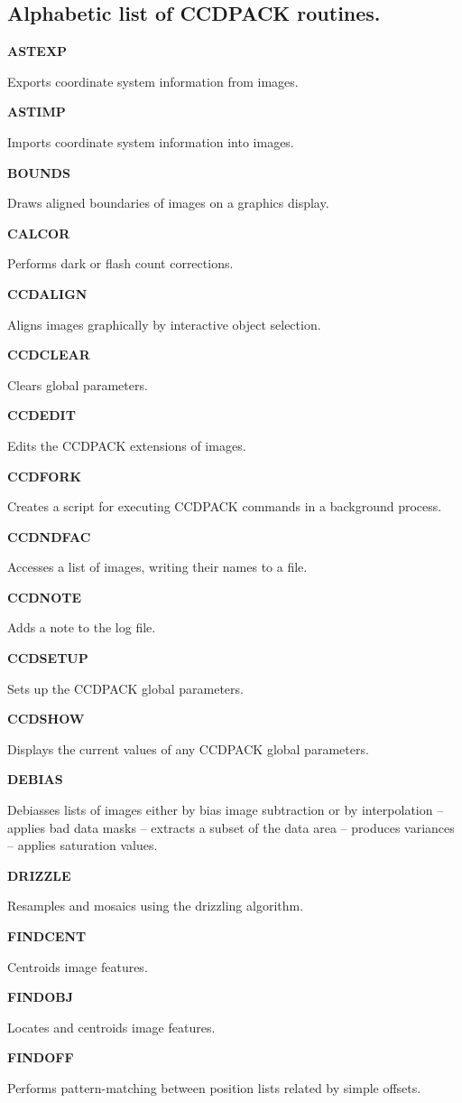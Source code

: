 \documentclass[twoside,11pt]{article}
\newenvironment{latexonly}{}{}
\renewcommand{\_}{\texttt{\symbol{95}}}
\newcommand{\quickdes}[3]{
                         \parbox{1.1in}{\bf #1}
                         \parbox{4.4in}{\raggedright #2 \dotfill}
                         \parbox{0.6in}{\pageref{#3}}
                         \vspace*{0.2in}}
\newcommand{\latexonlysubsection}[1]{\subsection{#1}}
\newcommand{\latexonlysubsection}[1]{#1}
\begin{document}
\newpage
\begin{latexonly}
\latexonlysubsection{Alphabetic list of CCDPACK routines.}
%
%
\quickdes{ASTEXP}{Exports coordinate system information from images.}
         {ASTEXP}

\quickdes{ASTIMP}{Imports coordinate system information into images.}{ASTIMP}

\quickdes{BOUNDS}{Draws aligned boundaries of images on a graphics display.}
                 {BOUNDS}

\quickdes{CALCOR}{Performs dark or flash count corrections.}{CALCOR}

\quickdes{CCDALIGN}{Aligns images graphically by interactive object selection.}
         {CCDALIGN}

\quickdes{CCDCLEAR}{Clears global parameters.}
         {CCDCLEAR}


\quickdes{CCDEDIT}{Edits the CCDPACK extensions of images.}
         {CCDEDIT}

\quickdes{CCDFORK}{Creates a script for executing CCDPACK
                   commands in a background process.}{CCDFORK}

\quickdes{CCDNDFAC}{Accesses a list of images, writing their names to a file.}
         {CCDNDFAC}

\quickdes{CCDNOTE}{Adds a note to the log file.}{CCDNOTE}

\quickdes{CCDSETUP}{Sets up the CCDPACK global parameters.}{CCDSETUP}

\quickdes{CCDSHOW}{Displays the current values of any CCDPACK global
                   parameters.}{CCDSHOW}

\quickdes{DEBIAS}{Debiasses lists of images either by bias image
                 subtraction or by interpolation --
                 applies bad data masks --
                 extracts a subset of the data area --
                 produces variances --
                 applies saturation values.}
                 {DEBIAS}

\quickdes{DRIZZLE}{Resamples and mosaics using the drizzling algorithm.}
                  {DRIZZLE}

\quickdes{FINDCENT}{Centroids image features.}
                   {FINDCENT}

\quickdes{FINDOBJ}{Locates and centroids image features.}
                  {FINDOBJ}

\newpage

\quickdes{FINDOFF}{Performs pattern-matching between position lists
                   related by simple offsets.}
                   {FINDOFF}


\end{latexonly}
\end{document}
